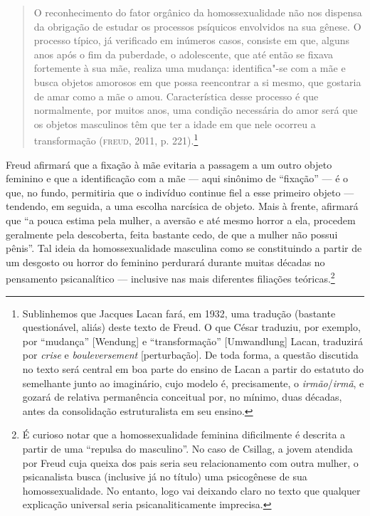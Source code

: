\begin{quote}
O reconhecimento do fator orgânico da homossexualidade não nos dispensa
da obrigação de estudar os processos psíquicos envolvidos na sua gênese.
O processo típico, já verificado em inúmeros casos, consiste em que,
alguns anos após o fim da puberdade, o adolescente, que até então se
fixava fortemente à sua mãe, realiza uma mudança: identifica"-se com a
mãe e busca objetos amorosos em que possa reencontrar a si mesmo, que
gostaria de amar como a mãe o amou. Característica desse processo é que
normalmente, por muitos anos, uma condição necessária do amor será que
os objetos masculinos têm que ter a idade em que nele ocorreu a
transformação (\textsc{freud}, 2011, p. 221).\footnote{Sublinhemos que
  Jacques Lacan fará, em 1932, uma tradução (bastante questionável,
  aliás) deste texto de Freud. O que César traduziu, por exemplo, por
  ``mudança'' {[}Wendung{]} e ``transformação'' {[}Umwandlung{]} Lacan,
  traduzirá por \emph{crise} e \emph{bouleversement} {[}perturbação{]}.
  De toda forma, a questão discutida no texto será central em boa parte
  do ensino de Lacan a partir do estatuto do semelhante junto ao
  imaginário, cujo modelo é, precisamente, o \emph{irmão}/\emph{irmã}, e
  gozará de relativa permanência conceitual por, no mínimo, duas
  décadas, antes da consolidação estruturalista em seu ensino.}
\end{quote}

Freud afirmará que a fixação à mãe evitaria a passagem a um outro objeto
feminino e que a identificação com a mãe --- aqui sinônimo de
``fixação'' --- é o que, no fundo, permitiria que o indivíduo continue
fiel a esse primeiro objeto --- tendendo, em seguida, a uma escolha
narcísica de objeto. Mais à frente, afirmará que ``a pouca estima pela
mulher, a aversão e até mesmo horror a ela, procedem geralmente pela
descoberta, feita bastante cedo, de que a mulher não possui pênis''. Tal
ideia da homossexualidade masculina como se constituindo a partir de um
desgosto ou horror do feminino perdurará durante muitas décadas no
pensamento psicanalítico --- inclusive nas mais diferentes filiações
teóricas.\footnote{É curioso notar que a homossexualidade feminina
  dificilmente é descrita a partir de uma ``repulsa do masculino''. No
  caso de Csillag, a jovem atendida por Freud cuja queixa dos pais seria
  seu relacionamento com outra mulher, o psicanalista busca (inclusive
  já no título) uma psicogênese de sua homossexualidade. No entanto,
  logo vai deixando claro no texto que qualquer explicação universal
  seria psicanaliticamente imprecisa.}

